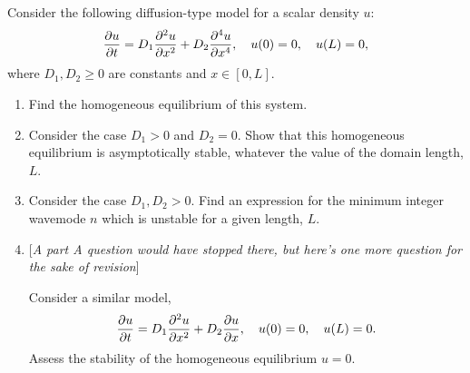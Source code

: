 \documentclass[a4paper, 12pt]{article}
\begin{document}
\begin{enumerate}[label={\bf \arabic{*}.\;}, ref={\arabic{*}},itemsep=3ex, left=0ex]
{    }


    {
      Consider the following diffusion-type model for a scalar density $u$:
      \begin{equation}
        \pd{u}{t} = D_1 \pdd{u}{x} + D_2\pdn{4}{u}{x},\quad  u(0) = 0,\quad u(L)=0,
      \end{equation}
      where $D_1,D_2\geq 0$ are constants and $x\in[0,L]$.
      \begin{enumerate}[label=(\alph*)]
        \item Find the homogeneous equilibrium of this system.

        \item Consider the case $D_1>0$ and $D_2=0$. Show that this homogeneous equilibrium is asymptotically stable, whatever the value of the domain length, $L$.

        \item Consider the case $D_1,D_2>0$. Find an expression for the minimum integer wavemode $n$ which is unstable for a given length, $L$.

        \item{}[\emph{A part A question would have stopped there, but here's one more question for the sake of revision}]

          Consider a similar model,
          \begin{equation}
            \pd{u}{t} = D_1 \pdd{u}{x} + D_2\pd{u}{x},\quad u(0) = 0,\quad u(L)=0.
          \end{equation}
          Assess the stability of the homogeneous equilibrium $u=0$.


\end{enumerate}}
\end{enumerate}
\end{document}
